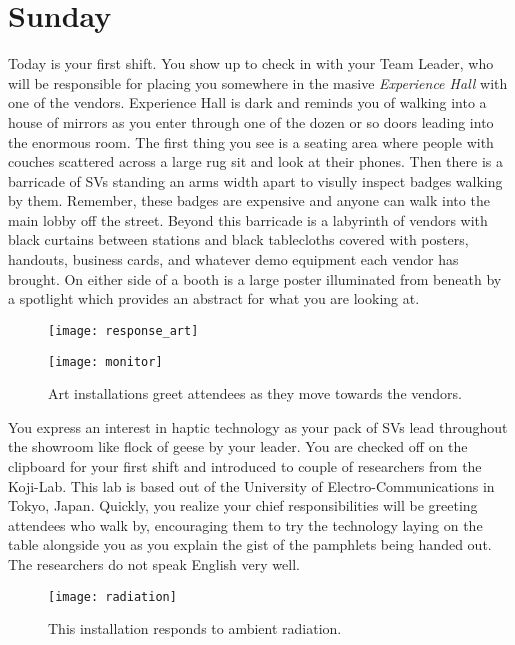 \documentclass[../main.tex]{subfiles}
\begin{document}
\section{Sunday}

Today is your first shift. You show up to check in with your Team Leader, who will be responsible for placing you somewhere in the masive \textit{Experience Hall} with one of the vendors. Experience Hall is dark and reminds you of walking into a house of mirrors as you enter through one of the dozen or so doors leading into the enormous room. The first thing you see is a seating area where people with couches scattered across a large rug sit and look at their phones. Then there is a barricade of SVs standing an arms width apart to visully inspect badges walking by them. Remember, these badges are expensive and anyone can walk into the main lobby off the street. Beyond this barricade is a labyrinth of vendors with black curtains between stations and black tablecloths covered with posters, handouts, business cards, and whatever demo equipment each vendor has brought. On either side of a booth is a large poster illuminated from beneath by a spotlight which provides an abstract for what you are looking at.

\begin{figure}[!tbp]
	\centering
	\begin{minipage}[b]{0.45\textwidth}
		\texttt{[image: response\_art]}
	\end{minipage}
	\hfill
	\begin{minipage}[b]{0.45\textwidth}
		\texttt{[image: monitor]}
	\end{minipage}
	\caption*{Art installations greet attendees as they move towards the vendors.}
\end{figure}

You express an interest in haptic technology as your pack of SVs lead throughout the showroom like flock of geese by your leader. You are checked off on the clipboard for your first shift and introduced to couple of researchers from the Koji-Lab. This lab is based out of the University of Electro-Communications in Tokyo, Japan. Quickly, you realize your chief responsibilities will be greeting attendees who walk by, encouraging them to try the technology laying on the table alongside you as you explain the gist of the pamphlets being handed out. The researchers do not speak English very well.

\begin{figure}[h!]
	\centering
	\texttt{[image: radiation]}
	\caption*{This installation responds to ambient radiation.}
\end{figure}
\end{document}
